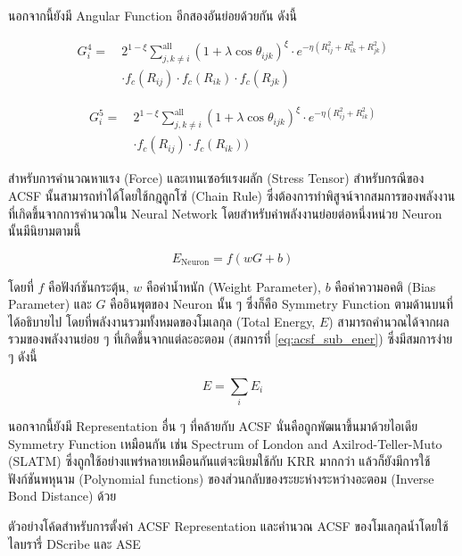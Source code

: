 นอกจากนี้ยังมี Angular Function อีกสองอันย่อยด้วยกัน ดังนี้

\begin{align}\label{eq:rf_g4}
    G^{4}_{i} =~&2^{1 - \xi}\sum^{\text{all}}_{j,k \neq i} (1+\lambda \cos \theta_{ijk})^{\xi}
    \cdot e^{-\eta(R^{2}_{ij} + R^{2}_{ik} + R^{2}_{jk})} \nonumber \\
    & \cdot f_{c}(R_{ij}) \cdot f_{c}(R_{ik}) \cdot f_{c}(R_{jk})
\end{align}

\begin{align}\label{eq:rf_g5}
    G^{5}_{i} =~&2^{1 - \xi}\sum^{\text{all}}_{j,k \neq i} (1+\lambda \cos \theta_{ijk})^{\xi}
    \cdot e^{-\eta(R^{2}_{ij} + R^{2}_{ik})} \nonumber \\
    & \cdot f_{c}(R_{ij}) \cdot f_{c}(R_{ik}))
\end{align}

สำหรับการคำนวณหาแรง (Force) และเทนเซอร์แรงผลัก (Stress Tensor) สำหรับกรณีของ ACSF นั้นสามารถทำได้โดยใช้กฎลูกโซ่ (Chain 
Rule) ซึ่งต้องการทำพิสูจน์จากสมการของพลังงานที่เกิดขึ้นจากการคำนวณใน Neural Network โดยสำหรับค่าพลังงานย่อยต่อหนึ่งหน่วย Neuron 
นั้นมีนิยามตามนี้

\begin{equation}
    \label{eq:acsf_sub_ener}
    E_{\text{Neuron}} = f(w G + b) 
\end{equation}

\noindent โดยที่ $f$ คือฟังก์ชันกระตุ้น, $w$ คือค่าน้ำหนัก (Weight Parameter), $b$ คือค่าความอคติ (Bias Parameter) และ $G$ 
คืออินพุตของ Neuron นั้น ๆ ซึ่งก็คือ Symmetry Function ตามด้านบนที่ได้อธิบายไป โดยที่พลังงานรวมทั้งหมดของโมเลกุล (Total Energy, 
$E$) สามารถคำนวณได้จากผลรวมของพลังงานย่อย ๆ ที่เกิดขึ้นจากแต่ละอะตอม (สมการที่ \ref{eq:acsf_sub_ener}) ซึ่งมีสมการง่าย ๆ ดังนี้

\begin{equation}
    E = \sum_{i} E_{i}
\end{equation}

นอกจากนี้ยังมี Representation อื่น ๆ ที่คล้ายกับ ACSF นั่นคือถูกพัฒนาขึ้นมาด้วยไอเดีย Symmetry Function เหมือนกัน เช่น 
Spectrum of London and Axilrod-Teller-Muto (SLATM) ซึ่งถูกใช้อย่างแพร่หลายเหมือนกันแต่จะนิยมใช้กับ KRR มากกว่า%
\autocite{faber2018,huang2020} แล้วก็ยังมีการใช้ฟังก์ชันพหุนาม (Polynomial functions) ของส่วนกลับของระยะห่างระหว่างอะตอม
(Inverse Bond Distance) ด้วย\autocite{kwac2019,musil2021}

ตัวอย่างโค้ดสำหรับการตั้งค่า ACSF Representation และคำนวณ ACSF ของโมเลกุลน้ำโดยใช้ไลบรารี่ DScribe และ ASE

